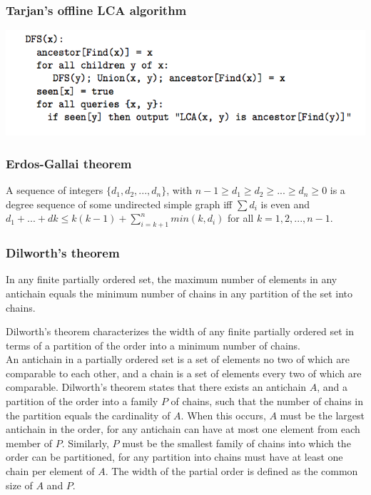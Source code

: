 \documentclass[a4paper,12pt]{article}
\begin{document}
\subsubsection{Tarjan’s offline LCA algorithm}
  \includegraphics[scale=.7]{graph/offlinelca.png}

\subsubsection{Erdos-Gallai theorem}
A sequence of integers $\{d_1,d_2,...,d_n\}$, with $n-1 \geq d_1 \geq d_2 \geq ... \geq d_n \geq 0$ is a degree sequence of some undirected simple graph iff $\sum d_i$ is even and $d_1+ ... + dk \leq k(k-1)+ \sum_{i=k+1}^{n}min(k, d_i)$
for all $k = 1, 2, . . . , n - 1$.

\subsubsection{Dilworth's theorem}
In any finite partially ordered set, the maximum number of elements in any antichain equals the minimum number of chains in any partition of the set into chains.

Dilworth's theorem characterizes the width of any finite partially ordered set in terms of a partition of the order into a minimum number of chains.\\
An antichain in a partially ordered set is a set of elements no two of which are comparable to each other, and a chain is a set of elements every two of which are comparable. Dilworth's theorem states that there exists an antichain $A$,
and a partition of the order into a family $P$ of chains, such that the number of chains in the partition equals the cardinality of $A$. When this occurs, $A$ must be the largest antichain in the order, for any antichain can have at most one
element from each member of $P$. Similarly, $P$ must be the smallest family of chains into which the order can be partitioned, for any partition into chains must have at least one chain per element of $A$. The width of the partial order is
defined as the common size of $A$ and $P$. 
\end{document}
